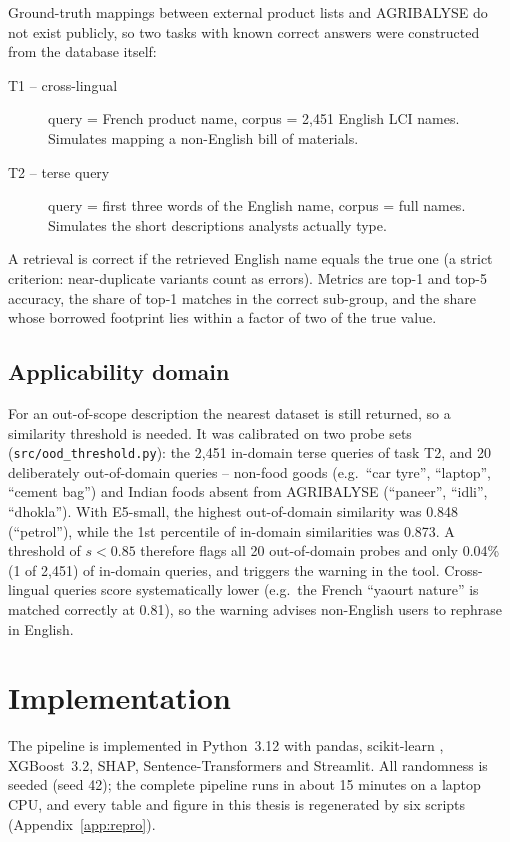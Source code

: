 Ground-truth mappings between external product lists and AGRIBALYSE do not exist publicly, so two
tasks with known correct answers were constructed from the database itself:
\begin{description}
  \item[T1 -- cross-lingual] query = French product name, corpus = 2{,}451 English LCI names.
  Simulates mapping a non-English bill of materials.
  \item[T2 -- terse query] query = first three words of the English name, corpus = full names.
  Simulates the short descriptions analysts actually type.
\end{description}
A retrieval is correct if the retrieved English name equals the true one (a strict criterion:
near-duplicate variants count as errors). Metrics are top-1 and top-5 accuracy, the share of
top-1 matches in the correct sub-group, and the share whose borrowed footprint lies within a factor
of two of the true value.

\subsection{Applicability domain}

For an out-of-scope description the nearest dataset is still returned, so a similarity threshold
is needed. It was calibrated on two probe sets (\texttt{src/ood\_threshold.py}): the 2{,}451
in-domain terse queries of task T2, and 20 deliberately out-of-domain queries -- non-food goods
(e.g.\ ``car tyre'', ``laptop'', ``cement bag'') and Indian foods absent from AGRIBALYSE
(``paneer'', ``idli'', ``dhokla''). With E5-small, the highest out-of-domain similarity was 0.848
(``petrol''), while the 1st percentile of in-domain similarities was 0.873. A threshold of
$s<0.85$ therefore flags all 20 out-of-domain probes and only 0.04\% (1 of 2{,}451) of in-domain
queries, and triggers the warning in the tool. Cross-lingual queries score systematically lower
(e.g.\ the French ``yaourt nature'' is matched correctly at 0.81), so the warning advises
non-English users to rephrase in English.

\section{Implementation}

The pipeline is implemented in Python~3.12 with pandas, scikit-learn \citep{pedregosa2011},
XGBoost~3.2, SHAP, Sentence-Transformers and Streamlit. All randomness is seeded (seed 42); the
complete pipeline runs in about 15 minutes on a laptop CPU, and every table and figure in this
thesis is regenerated by six scripts (Appendix~\ref{app:repro}).
